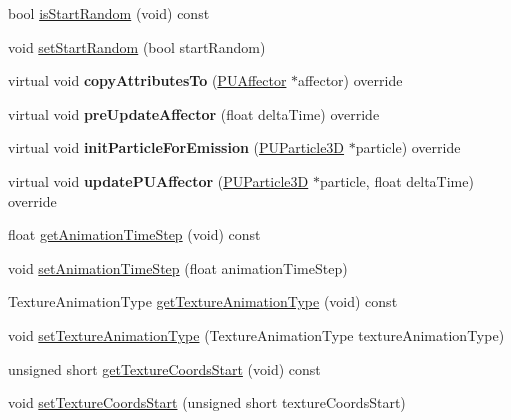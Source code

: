 \begin{DoxyCompactItemize}
\item 
bool \hyperlink{classPUTextureAnimator_af735af4741e4df123322d22153d1a95f}{is\+Start\+Random} (void) const
\item 
void \hyperlink{classPUTextureAnimator_a0f7dcc76337aa00523f0fdf4a4992247}{set\+Start\+Random} (bool start\+Random)
\item 
\mbox{\label{classPUTextureAnimator_a1b1665d0cc2f843e6edee2d9eb044f10}} 
virtual void {\bfseries copy\+Attributes\+To} (\hyperlink{classPUAffector}{P\+U\+Affector} $\ast$affector) override
\item 
\mbox{\label{classPUTextureAnimator_a74059fd2233210319905c853996bad2c}} 
virtual void {\bfseries pre\+Update\+Affector} (float delta\+Time) override
\item 
\mbox{\label{classPUTextureAnimator_a60778bfe2a4b304340d781d4534c3e6d}} 
virtual void {\bfseries init\+Particle\+For\+Emission} (\hyperlink{structPUParticle3D}{P\+U\+Particle3D} $\ast$particle) override
\item 
\mbox{\label{classPUTextureAnimator_a1976d70f425f6c2f3257257ad543b891}} 
virtual void {\bfseries update\+P\+U\+Affector} (\hyperlink{structPUParticle3D}{P\+U\+Particle3D} $\ast$particle, float delta\+Time) override
\item 
float \hyperlink{classPUTextureAnimator_a62c538e770b330f543cd2e9dada3b628}{get\+Animation\+Time\+Step} (void) const
\item 
void \hyperlink{classPUTextureAnimator_a30b55a0ffb5b0e96f9f04a0731f86894}{set\+Animation\+Time\+Step} (float animation\+Time\+Step)
\item 
Texture\+Animation\+Type \hyperlink{classPUTextureAnimator_af7a73845a0269163ed0b56577809a07a}{get\+Texture\+Animation\+Type} (void) const
\item 
void \hyperlink{classPUTextureAnimator_ad026f691979e84924cb94227e5893ab8}{set\+Texture\+Animation\+Type} (Texture\+Animation\+Type texture\+Animation\+Type)
\item 
unsigned short \hyperlink{classPUTextureAnimator_ae0cca6bdadc0efc89f1bb73582b26618}{get\+Texture\+Coords\+Start} (void) const
\item 
void \hyperlink{classPUTextureAnimator_a6a36ac552c18aec4bba640b9c75c0cd3}{set\+Texture\+Coords\+Start} (unsigned short texture\+Coords\+Start)

\end{DoxyCompactItemize}
